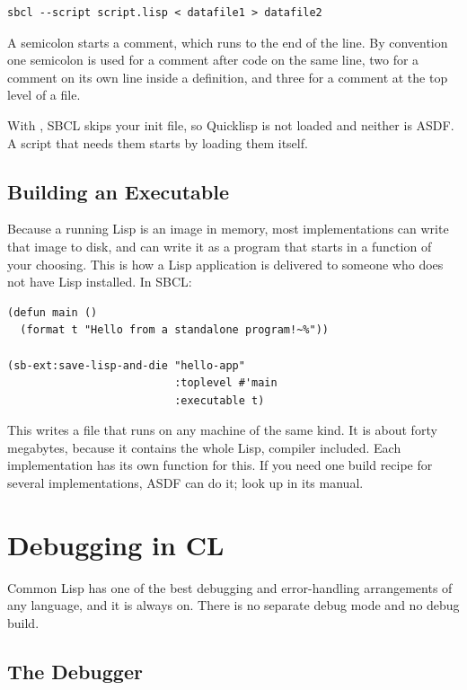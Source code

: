 \begin{verbatim}
sbcl --script script.lisp < datafile1 > datafile2
\end{verbatim}

A semicolon starts a comment, which runs to the end of the line. By
convention one semicolon is used for a comment after code on the same
line, two for a comment on its own line inside a definition, and three
for a comment at the top level of a file.

With , SBCL skips your init file, so Quicklisp is not
loaded and neither is ASDF. A script that needs them starts by
loading them itself.

\subsection{Building an Executable}

Because a running Lisp is an image in memory, most implementations
can write that image to disk, and can write it as a program that
starts in a function of your choosing. This is how a Lisp application
is delivered to someone who does not have Lisp installed. In SBCL:

\begin{verbatim}
(defun main ()
  (format t "Hello from a standalone program!~%"))

(sb-ext:save-lisp-and-die "hello-app"
                          :toplevel #'main
                          :executable t)
\end{verbatim}

This writes a file  that runs on any machine of the
same kind. It is about forty megabytes, because it contains the whole
Lisp, compiler included. Each implementation has its own function
for this. If you need one build recipe for several implementations,
ASDF can do it; look up  in its manual.

\section{Debugging in CL}
\label{sec:debugging}

Common Lisp has one of the best debugging and error-handling
arrangements of any language, and it is always on. There is no
separate debug mode and no debug build.

\subsection{The Debugger}

